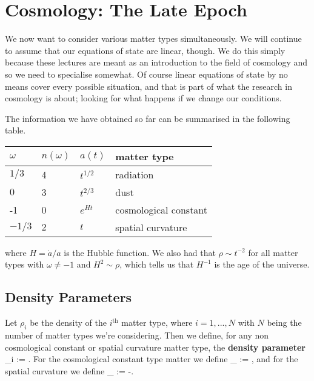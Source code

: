 \chapter{Cosmology: The Late Epoch}

We now want to consider various matter types simultaneously. We will continue to assume that our equations of state are linear, though. We do this simply because these lectures are meant as an introduction to the field of cosmology and so we need to specialise somewhat. Of course linear equations of state by no means cover every possible situation, and that is part of what the research in cosmology is about; looking for what happens if we change our conditions. 

The information we have obtained so far can be summarised in the following table. 

\begin{center}
	\begin{tabular}{@{} p{2cm}p{2cm}p{2cm}p{3.7cm}@{}}
		\toprule
		$\omega$ & $n(\omega)$ & $a(t)$ & matter type\\
		\midrule 
		$1/3$ & 4 & $t^{1/2}$ & radiation \\
		$0$ & 3 & $t^{2/3}$ & dust \\
		-1 & 0 & $e^{Ht}$ & cosmological constant \\
		$-1/3$ & $2$ & $t$ & spatial curvature \\ 
		\bottomrule
	\end{tabular}
\end{center}
where $H = \dot{a}/a$ is the Hubble function. We also had that $\rho\sim t^{-2}$ for all matter types with $\omega\neq -1$ and $H^2\sim \rho$, which tells us that $H^{-1}$ is the age of the universe. 

\section{Density Parameters}

    Let $\rho_i$ be the density of the $i^{\text{th}}$ matter type, where $i=1,...,N$ with $N$ being the number of matter types we're considering. Then we define, for any non cosmological constant or spatial curvature matter type, the \textbf{density parameter}
    \bse 
        \Omega_i :=  .
    \ese 
    For the cosmological constant type matter we define 
    \bse 
        \Omega_{\Lambda} := ,
    \ese 
    and for the spatial curvature we define 
    \bse 
        \Omega_{\kappa} := -.
    \ese
\ed 

